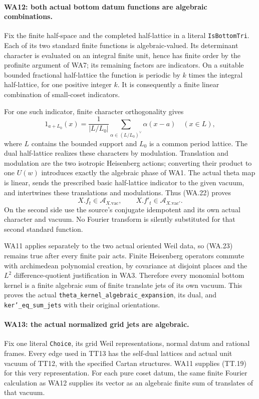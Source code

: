 \paragraph{WA12: both actual bottom datum functions are algebraic combinations.}
Fix the finite half-space and the completed half-lattice in a
literal \texttt{IsBottomTri}.  Each of its two standard finite
functions is algebraic-valued.  Its determinant character is
evaluated on an integral finite unit, hence has finite order by
the profinite argument of WA7; its remaining factors are
indicators.  On a suitable bounded fractional half-lattice the
function is periodic by $k$ times the integral half-lattice,
for one positive integer $k$.  It is consequently a finite
linear combination of small-coset indicators.

For one such indicator, finite character orthogonality gives
\[
  1_{a+L_0}(x)=\frac1{|L/L_0|}
        \sum_{\alpha\in(L/L_0)^\vee}\alpha(x-a)
                                      \quad (x\in L),       \tag{WA.22}
\]
where $L$ contains the bounded support and $L_0$ is a common
period lattice.  The dual half-lattice realizes these characters
by modulation.  Translation and modulation are the two
isotropic Heisenberg actions; converting their product to one
$U(w)$ introduces exactly the algebraic phase of WA1.
The actual theta map is linear, sends the prescribed basic
half-lattice indicator to the given vacuum, and intertwines
these translations and modulations.  Thus (WA.22) proves
\[
             X.f_t\in\mathcal A_{X.\mathrm{vac}},\qquad
             X.f'_t\in\mathcal A_{X.\mathrm{vac}'}.          \tag{WA.23}
\]
On the second side use the source's conjugate idempotent and its
own actual character and vacuum.  No Fourier transform is
silently substituted for that second standard function.

WA11 applies separately to the two actual oriented Weil data,
so (WA.23) remains true after every finite pair acts.  Finite
Heisenberg operators commute with archimedean polynomial
creation, by covariance at disjoint places and the $L^2$
difference-quotient justification in WA3.  Therefore every
monomial bottom kernel is a finite algebraic sum of finite
translate jets of its own vacuum.  This proves the actual
\texttt{theta\_kernel\_algebraic\_expansion}, its dual, and
\texttt{ker'\_eq\_sum\_jets} with their original orientations.

\paragraph{WA13: the actual normalized grid jets are algebraic.}
Fix one literal \texttt{Choice}, its grid Weil representations,
normal datum and rational frames.  Every edge used in TT13 has
the self-dual lattices and actual unit vacuum of TT12, with the
specified Cartan structures.  WA11 supplies (TT.19) for this
very representation.  For each pure coset datum, the same
finite Fourier calculation as WA12 supplies its vector as an
algebraic finite sum of translates of that vacuum.

